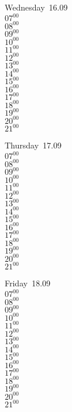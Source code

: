 \documentclass[11pt,a4paper]{book}\usepackage[]{graphicx}\usepackage[]{color}
\begin{document}
\begin{weekdaybox}
  Wednesday~16.09\\
  { 
  \vfill
  $07^{00}$\\
$08^{00}$\\
$09^{00}$\\
$10^{00}$\\
$11^{00}$\\
$12^{00}$\\
$13^{00}$\\
$14^{00}$\\
$15^{00}$\\
$16^{00}$\\
$17^{00}$\\
$18^{00}$\\
$19^{00}$\\
$20^{00}$\\
$21^{00}$\\
  }
\end{weekdaybox}
\clearpage
\begin{headerbox}
\end{headerbox}
\begin{weekdaybox}
  Thursday~17.09\\
  { 
  \vfill
  $07^{00}$\\
$08^{00}$\\
$09^{00}$\\
$10^{00}$\\
$11^{00}$\\
$12^{00}$\\
$13^{00}$\\
$14^{00}$\\
$15^{00}$\\
$16^{00}$\\
$17^{00}$\\
$18^{00}$\\
$19^{00}$\\
$20^{00}$\\
$21^{00}$\\
  }
\end{weekdaybox} 
\begin{weekdaybox}
  Friday~18.09\\
  { 
  \vfill
  $07^{00}$\\
$08^{00}$\\
$09^{00}$\\
$10^{00}$\\
$11^{00}$\\
$12^{00}$\\
$13^{00}$\\
$14^{00}$\\
$15^{00}$\\
$16^{00}$\\
$17^{00}$\\
$18^{00}$\\
$19^{00}$\\
$20^{00}$\\
$21^{00}$\\
  }
\end{weekdaybox}
\end{document}
